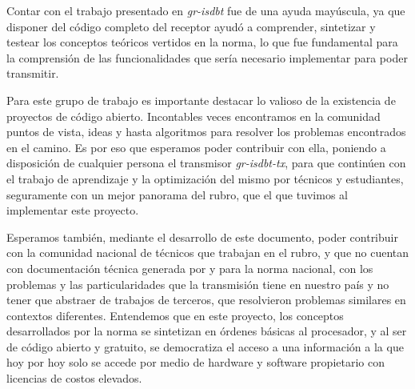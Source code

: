 Contar con el trabajo presentado en \textit{gr-isdbt} fue de una ayuda mayúscula, ya que disponer del código completo del receptor ayudó a comprender, sintetizar y testear los conceptos teóricos vertidos en la norma, lo que fue fundamental para la comprensión de las funcionalidades que sería necesario implementar para poder transmitir. 

Para este grupo de trabajo es importante destacar lo valioso de la existencia de proyectos de código abierto. Incontables veces encontramos en la comunidad puntos de vista, ideas y hasta algoritmos para resolver los problemas encontrados en el camino. Es por eso que esperamos poder contribuir con ella, poniendo a disposición de cualquier persona el transmisor \textit{gr-isdbt-tx}, para que continúen con el trabajo de aprendizaje y la optimización del mismo por técnicos y estudiantes, seguramente con un mejor panorama del rubro, que el que tuvimos al implementar este proyecto.

Esperamos también, mediante el desarrollo de este documento, poder contribuir con la comunidad nacional de técnicos que trabajan en el rubro, y que no cuentan con documentación técnica generada por y para la norma nacional, con los problemas y las particularidades que la transmisión tiene en nuestro país y no tener que abstraer de trabajos de terceros, que resolvieron problemas similares en contextos diferentes. Entendemos que en este proyecto, los conceptos desarrollados por la norma se sintetizan en órdenes básicas al procesador, y al ser de código abierto y gratuito, se democratiza el acceso a una información a la que hoy por hoy solo se accede por medio de hardware y software propietario con licencias de costos elevados.

